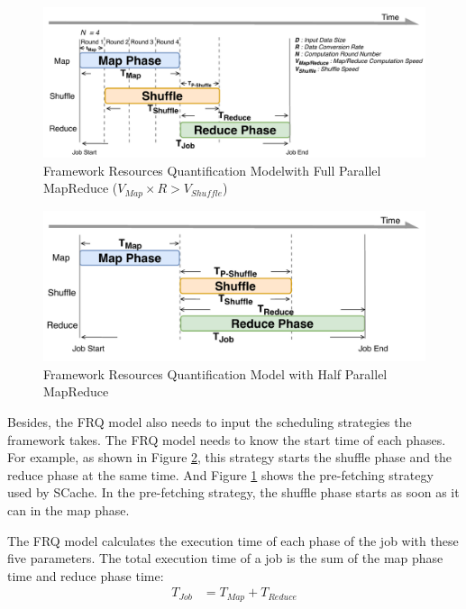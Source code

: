 {\begin{figure}
    \centering
	\includegraphics[width=\linewidth]{fig/model_basic}
	\caption{\color{black}Framework Resources Quantification Model\newline with Full Parallel MapReduce (\(V_{Map} \times R > V_{Shuffle}\))}
    \label{fig:model_basic}
\end{figure}
\begin{figure}
	\centering
	\includegraphics[width=\linewidth]{fig/model_hadoop}
	\caption{\color{black}Framework Resources Quantification Model with Half Parallel MapReduce}
	\label{fig:model_hadoop}
\end{figure}

{\color{black}
Besides, the FRQ model also needs to input the scheduling strategies the framework takes.
The FRQ model needs to know the start time of each phases.
For example, as shown in Figure \ref{fig:model_hadoop}, this strategy starts the shuffle phase and the reduce phase at the same time.
And Figure \ref{fig:model_basic} shows the pre-fetching strategy used by SCache. In the pre-fetching strategy, the shuffle phase starts as soon as it can in the map phase.
}

The FRQ model calculates the execution time of each phase of the job with these five parameters.
The total execution time of a job is the sum of the map phase time and reduce phase time:
\begin{equation}
\label{equation_Tjob}
\begin{aligned}
    T_{Job} &= T_{Map} + T_{Reduce}
\end{aligned}
\end{equation}

}
